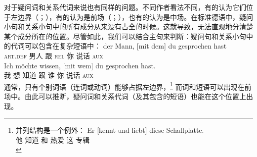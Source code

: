 对于疑问词和关系代词来说也有同样的问题。不同作者看法不同，有的认为它们位于左边界（\citealp{Kathol2001a}；\citealp[]{Eisenberg2004a}），有的认为是前场（\citealp[§1345]{Duden2005-Authors}；\citealp[--30, \S~3.1]{Woellstein2010a-u}），也有的认为是中场\citep[]{AH2004a-u}。在标准德语中，疑问小句和关系小句中的所有成分从来没有占全的时候。这就导致，无法直观地分清楚某个成分所在的位置。尽管如此，我们可以结合主句来判断：疑问句和关系小句中的代词可以包含在复杂短语中：
\eal
\ex 
\gll der Mann,         [mit dem] du gesprochen hast\\
     \textsc{art}.\textsc{def} 男人 \spacebr{}跟 \textsc{rel} 你 说话 \textsc{aux}\\
\ex 
\gll Ich möchte wissen, [mit wem] du gesprochen hast.\\
     我 想 知道 \spacebr{}跟 谁 你 说话 \textsc{aux}\\
\zl
通常，只有个别词语（连词或动词）能够占据左边界，\footnote{%
 并列结构是一个例外：
\ea
\gll Er [kennt und liebt] diese Schallplatte.\\
     他 \spacebr{}知道 和 热爱 这 专辑\\
\z
} 
而词和短语可以出现在前场中。由此可以推断，疑问词和关系代词（及其包含的短语）也能在这个位置上出现。

